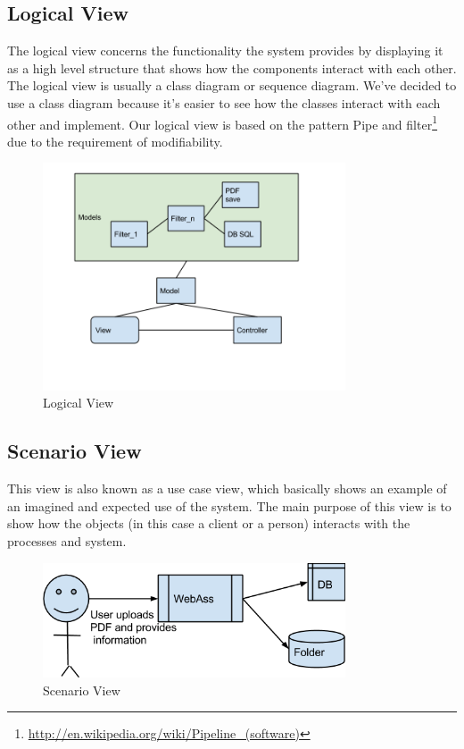 \subsection{Logical View}
The logical view concerns the functionality the system provides by displaying it as a high level structure that shows how the components interact with each other. The logical view is usually a class diagram or sequence diagram. We've decided to use a class diagram because it's easier to see how the classes interact with each other and implement. Our logical view is based on the pattern Pipe and filter\footnote{\href{http://en.wikipedia.org/wiki/Pipeline_(software)}{http://en.wikipedia.org/wiki/Pipeline\_(software)}} due to the requirement of modifiability.
\begin{figure}[H]
\centering
\includegraphics[width=0.8\textwidth]{images/architecture00.png}
\caption{Logical View}
\label{fig:logical_view}
\end{figure}


\subsection{Scenario View}
This view is also known as a use case view, which basically shows an example of an imagined and expected use of the system. The main purpose of this view is to show how the objects (in this case a client or a person) interacts with the processes and system.
\begin{figure}[H]
\centering
\includegraphics[width=0.8\textwidth]{images/architecture01.png}
\caption{Scenario View}
\label{fig:scenario_view}
\end{figure}




